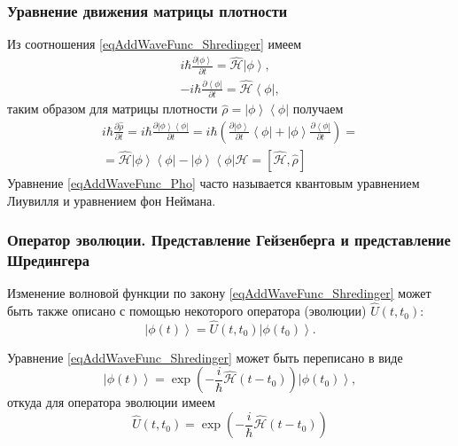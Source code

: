 \subsubsection{Уравнение движения матрицы плотности}
Из соотношения \eqref{eqAddWaveFunc_Shredinger} имеем
\begin{eqnarray}
i \hbar \frac{\partial \left| \phi \right>}{\partial t} = \hat{\mathcal{H}}
\left| \phi \right>,
\nonumber \\
- i \hbar \frac{\partial \left< \phi \right|}{\partial t} = \hat{\mathcal{H}}
\left< \phi \right|,
\nonumber
\end{eqnarray}
таким образом для матрицы плотности 
$\hat{\rho} = \left| \phi \right>\left< \phi \right|$ получаем
\begin{eqnarray}
i \hbar \frac{\partial \hat{\rho} }{\partial t} = 
i \hbar \frac{\partial  \left| \phi \right>\left< \phi \right|
}{\partial t} = 
i \hbar \left( \frac{\partial \left| \phi \right>}{\partial t}\left< \phi
\right| +
\left| \phi \right> \frac{\partial \left< \phi \right|}{\partial t}
\right) =
\nonumber \\
=  \hat{\mathcal{H}} \left| \phi \right>\left< \phi \right| -
\left| \phi \right>\left< \phi \right|\hat{\mathcal{H}} = 
\left[ \hat{\mathcal{H}}, \hat{\rho} \right]
\label{eqAddWaveFunc_Pho}
\end{eqnarray}
Уравнение \eqref{eqAddWaveFunc_Pho} часто называется квантовым
уравнением Лиувилля и уравнением фон Неймана.

\subsubsection{Оператор эволюции. Представление Гейзенберга и
  представление Шредингера}

Изменение волновой функции по закону \eqref{eqAddWaveFunc_Shredinger}
может быть также описано с помощью некоторого оператора (эволюции) $\hat{U}\left(t,t_0\right)$:
\begin{equation}
\left| \phi\left(t\right) \right> = 
\hat{U}\left(t,t_0\right)\left| \phi\left(t_0\right) \right>.
\label{eqAddWaveFunc_ShredingerU}
\end{equation}

Уравнение \eqref{eqAddWaveFunc_Shredinger} может быть переписано в
виде
\begin{equation}
\left| \phi\left(t\right) \right> = 
\exp\left( -\frac{i}{\hbar} \hat{\mathcal{H}} \left( t - t_0 \right)  \right)
\left| \phi\left(t_0\right) \right>,
\nonumber
\end{equation}
откуда для оператора эволюции имеем
\begin{equation}
\hat{U}\left(t,t_0\right) = 
\exp\left( -\frac{i}{\hbar} \hat{\mathcal{H}} \left( t - t_0 \right)  \right)
\label{eqAddDiracEvolutionOper}
\end{equation}

